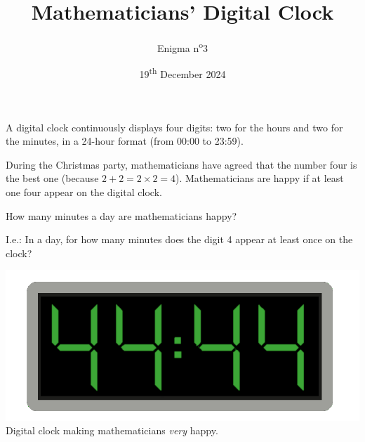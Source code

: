 \documentclass[a4paper, top=10mm]{article}
\title{\textbf{\huge{Mathematicians' Digital Clock}}}
\author{Enigma n\textsuperscript{o}3}
\date{19\textsuperscript{th} December 2024}
\begin{document}
	\maketitle
	
	A digital clock continuously displays four digits: two for the hours and two for the minutes, in a 24-hour format (from 00:00 to 23:59).
	
	During the Christmas party, mathematicians have agreed that the number four is the best one (because $2 + 2 = 2 \times 2 = 4$).
	Mathematicians are happy if at least one four appear on the digital clock.
	
	How many minutes a day are mathematicians happy?
	
	I.e.: In a day, for how many minutes does the digit 4 appear at least once on the clock?
	
	\begin{center}
		\includegraphics[width=\linewidth]{03clock.png}\\
		Digital clock making mathematicians \textit{very} happy.
	\end{center}
	
	
\end{document}
